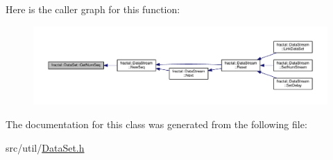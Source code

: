 Here is the caller graph for this function\+:\nopagebreak
\begin{figure}[H]
\begin{center}
\leavevmode
\includegraphics[width=350pt]{dd/d28/classfractal_1_1DataSet_a77fa290db2143cc18c161ff3f85077f2_icgraph}
\end{center}
\end{figure}




The documentation for this class was generated from the following file\+:\begin{DoxyCompactItemize}
\item 
src/util/\hyperlink{DataSet_8h}{Data\+Set.\+h}\end{DoxyCompactItemize}
